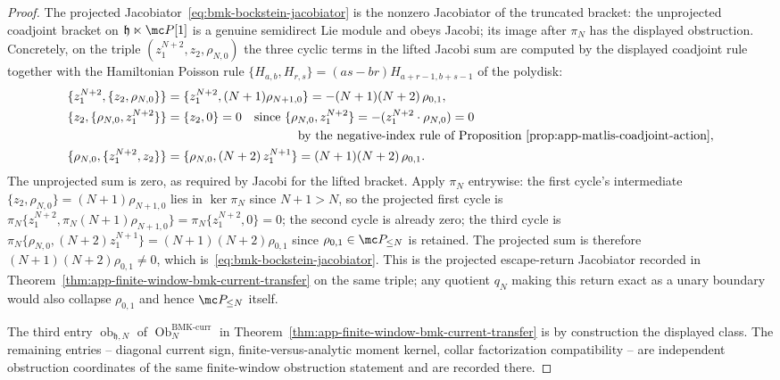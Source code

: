 \begin{proof}
  The projected
  Jacobiator~\eqref{eq:bmk-bockstein-jacobiator} is the nonzero
  Jacobiator of the truncated bracket: the unprojected coadjoint
  bracket on
  \(\mathfrak h\ltimes\mc P[1]\) is a genuine semidirect Lie module
  and obeys Jacobi; its image after \(\pi_N\) has the displayed
  obstruction.
  Concretely, on the triple \((z_1^{N+2},z_2,\rho_{N,0})\) the three
  cyclic terms in the lifted Jacobi sum are computed by the displayed
  coadjoint rule together with the Hamiltonian Poisson rule
  \(\{H_{a,b},H_{r,s}\}=(as-br)H_{a+r-1,b+s-1}\) of the polydisk:
  \[
  \begin{aligned}
    \{z_1^{N+2},\{z_2,\rho_{N,0}\}\}
      &=\{z_1^{N+2},(N+1)\rho_{N+1,0}\}
       =-(N+1)(N+2)\,\rho_{0,1}, \\
    \{z_2,\{\rho_{N,0},z_1^{N+2}\}\}
      &=\{z_2,0\}=0
       \quad\text{since } \{\rho_{N,0},z_1^{N+2}\}
       =-(z_1^{N+2}\cdot\rho_{N,0})=0\\
      &\hspace{3.7cm}\text{by the negative-index rule of
       Proposition~\ref{prop:app-matlis-coadjoint-action}},\\
    \{\rho_{N,0},\{z_1^{N+2},z_2\}\}
      &=\{\rho_{N,0},(N+2)\,z_1^{N+1}\}
       =(N+1)(N+2)\,\rho_{0,1}.
  \end{aligned}
  \]
  The unprojected sum is zero, as required by Jacobi for the lifted
  bracket.  Apply \(\pi_N\) entrywise: the first cycle's intermediate
  \(\{z_2,\rho_{N,0}\}=(N+1)\rho_{N+1,0}\) lies in \(\ker\pi_N\) since
  \(N+1>N\), so the projected first cycle is
  \(\pi_N\{z_1^{N+2},\pi_N(N+1)\rho_{N+1,0}\}
   =\pi_N\{z_1^{N+2},0\}=0\); the second cycle is already zero; the
  third cycle is
  \(\pi_N\{\rho_{N,0},(N+2)z_1^{N+1}\}=(N+1)(N+2)\rho_{0,1}\) since
  \(\rho_{0,1}\in\mc P_{\leq N}\) is retained.  The projected sum is
  therefore \((N+1)(N+2)\rho_{0,1}\neq 0\), which
  is~\eqref{eq:bmk-bockstein-jacobiator}.  This is the projected
  escape-return Jacobiator recorded in
  Theorem~\ref{thm:app-finite-window-bmk-current-transfer} on the same
  triple; any quotient \(q_N\) making this return exact as a unary
  boundary would also collapse \(\rho_{0,1}\) and hence
  \(\mc P_{\leq N}\) itself.

  The third entry \(\operatorname{ob}_{\mathfrak h,N}\) of
  \(\operatorname{Ob}^{\mathrm{BMK\mbox{-}curr}}_N\) in
  Theorem~\ref{thm:app-finite-window-bmk-current-transfer} is by
  construction the displayed class.  The remaining entries -- diagonal
  current sign, finite-versus-analytic moment kernel, collar
  factorization compatibility -- are independent obstruction
  coordinates of the same finite-window obstruction statement and are
  recorded there.
\end{proof}

